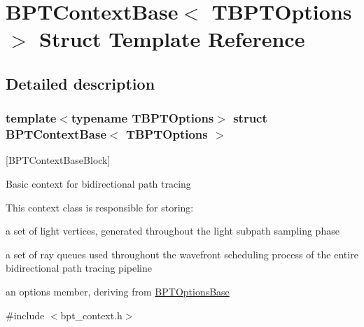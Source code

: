 \hypertarget{struct_b_p_t_context_base}{}\section{B\+P\+T\+Context\+Base$<$ T\+B\+P\+T\+Options $>$ Struct Template Reference}
\label{struct_b_p_t_context_base}


\subsection{Detailed description}
\subsubsection*{template$<$typename T\+B\+P\+T\+Options$>$\newline
struct B\+P\+T\+Context\+Base$<$ T\+B\+P\+T\+Options $>$}

\mbox{[}B\+P\+T\+Context\+Base\+Block\mbox{]} \begin{DoxyParagraph}{}
Basic context for bidirectional path tracing 
\end{DoxyParagraph}
\begin{DoxyParagraph}{}
This context class is responsible for storing\+: ~\newline

\begin{DoxyItemize}
\item a set of light vertices, generated throughout the light subpath sampling phase
\item a set of ray queues used throughout the wavefront scheduling process of the entire bidirectional path tracing pipeline
\item an options member, deriving from \hyperlink{struct_b_p_t_options_base}{B\+P\+T\+Options\+Base} 
\end{DoxyItemize}
\end{DoxyParagraph}


{\ttfamily \#include $<$bpt\+\_\+context.\+h$>$}

